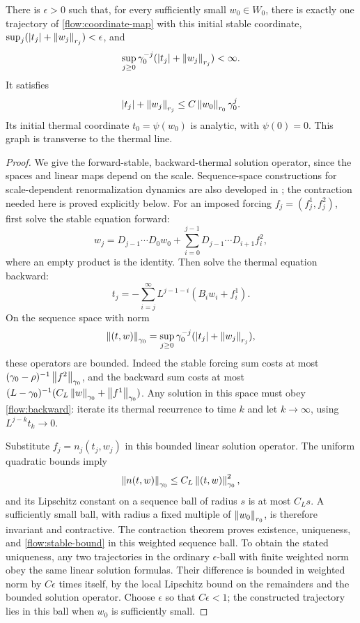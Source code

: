 \begin{lemma}\label{flow:stable-graph}
There is $\epsilon>0$ such that, for every sufficiently small
$w_0\in W_0$, there is exactly one trajectory of
\eqref{flow:coordinate-map} with this initial stable coordinate,
$\sup_j(|t_j|+\left\|w_j\right\|_{r_j})<\epsilon$, and
\[
        \sup_{j\ge0}\gamma_0^{-j}
                (|t_j|+\left\|w_j\right\|_{r_j})<\infty.
\]
It satisfies
\begin{equation}\label{flow:stable-bound}
 |t_j|+\left\|w_j\right\|_{r_j}\le C\left\|w_0\right\|_{r_0}\gamma_0^j.
\end{equation}
Its initial thermal coordinate $t_0=\psi(w_0)$ is analytic, with
$\psi(0)=0$.  This graph is transverse to the thermal line.
\end{lemma}

\begin{proof}
We give the forward-stable, backward-thermal solution operator, since
the spaces and linear maps depend on the scale. Sequence-space
constructions for scale-dependent renormalization dynamics are also
developed in \cite{BBS2015}; the contraction needed here is proved
explicitly below.  For an imposed forcing $f_j=(f_j^1,f_j^2)$, first solve
the stable equation forward:
\[
 w_j=D_{j-1}\cdots D_0w_0+
       \sum_{i=0}^{j-1}D_{j-1}\cdots D_{i+1}f_i^2,
\]
where an empty product is the identity.  Then solve the thermal
equation backward:
\begin{equation}\label{flow:backward}
 t_j=-\sum_{i=j}^{\infty}L^{j-1-i}(B_iw_i+f_i^1).
\end{equation}
On the sequence space with norm
\[
 \left\|(t,w)\right\|_{\gamma_0}
   =\sup_{j\ge0}\gamma_0^{-j}(|t_j|+\left\|w_j\right\|_{r_j}),
\]
these operators are bounded.  Indeed the stable forcing sum costs
at most $(\gamma_0-\rho)^{-1}\left\|f^2\right\|_{\gamma_0}$, and the
backward sum costs at most
$(L-\gamma_0)^{-1}(C_L\left\|w\right\|_{\gamma_0}
+\left\|f^1\right\|_{\gamma_0})$.  Any solution in this space must obey
\eqref{flow:backward}: iterate its thermal recurrence to time $k$
and let $k\to\infty$, using $L^{j-k}t_k\to0$.

Substitute $f_j=n_j(t_j,w_j)$ in this bounded linear solution operator.
The uniform quadratic bounds imply
\[
 \left\|n(t,w)\right\|_{\gamma_0}
       \le C_L\left\|(t,w)\right\|_{\gamma_0}^2,
\]
and its Lipschitz constant on a sequence ball of radius $s$ is at most
$C_Ls$.  A sufficiently small ball, with radius a fixed multiple of
$\left\|w_0\right\|_{r_0}$, is therefore invariant and contractive.  The
contraction theorem proves existence, uniqueness, and
\eqref{flow:stable-bound} in this weighted sequence ball.  To obtain
the stated uniqueness, any two trajectories in the ordinary
$\epsilon$-ball with finite weighted norm obey the same linear
solution formulas.  Their difference is bounded in weighted norm by
$C\epsilon$ times itself, by the local Lipschitz bound on the
remainders and the bounded solution operator.  Choose $\epsilon$ so
that $C\epsilon<1$; the constructed trajectory lies in this ball
when $w_0$ is sufficiently small.


\end{proof}
